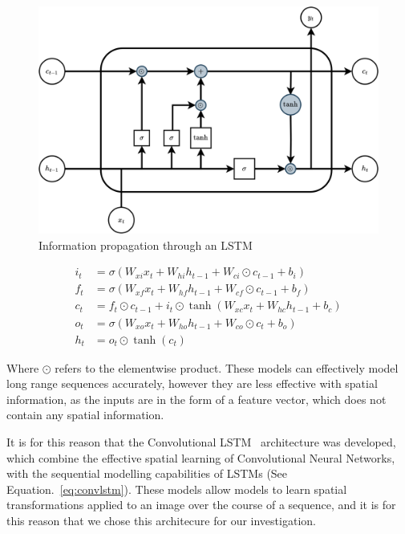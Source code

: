 \documentclass[twocolumn]{article}
\begin{document}
\begin{figure}
    \centering
    \includegraphics[scale=0.125]{assets/lstm.png}
    \caption{Information propagation through an LSTM}
    \label{fig:lstm}
\end{figure}

\begin{equation}
    \begin{aligned}
    i_t &= \sigma(W_{xi}x_t + W_{hi}h_{t-1} + W_{ci} \odot c_{t-1}+b_i) \\
    f_t &= \sigma(W_{xf}x_t + W_{hf}h_{t-1} + W_{cf} \odot c_{t-1}+b_f) \\
    c_t &= f_t \odot c_{t-1} + i_t \odot \tanh(W_{xc}x_t + W_{hc}h_{t-1}+b_c) \\
    o_t &= \sigma(W_{xo}x_t + W_{ho}h_{t-1} + W_{co} \odot c_{t}  +b_o) \\
    h_t &= o_t \odot \tanh(c_t)
    \end{aligned}
    \label{eq:lstm}
\end{equation}

Where $\odot$ refers to the elementwise product. These models can effectively model long range sequences accurately, however they are less effective with spatial information, as the inputs are in the form of a feature vector, which does not contain any spatial information. 

It is for this reason that the Convolutional LSTM~\cite{shi2015convolutionallstmnetworkmachine} architecture was developed, which combine the effective spatial learning of Convolutional Neural Networks, with the sequential modelling capabilities of LSTMs (See Equation.~\ref{eq:convlstm}). These models allow models to learn spatial transformations applied to an image over the course of a sequence, and it is for this reason that we chose this architecure for our investigation.  
\end{document}
